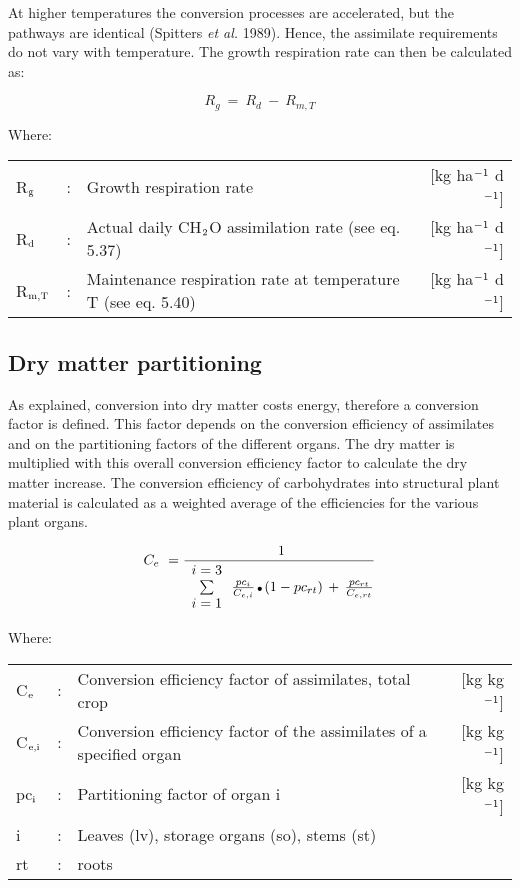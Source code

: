 At higher temperatures the conversion processes are accelerated, but the pathways are
identical (Spitters {\it et al.\/} 1989). Hence, the assimilate requirements do not vary with
temperature. The growth respiration rate can then be calculated as:

\begin{equation}
R _{g} ~=~ R _{d} ~-~ R _{m,T} 
\end{equation}

Where:\\
\begin{tabularx}{\textwidth}{llXr}
R$_{{\rm g}}$ &:& Growth respiration rate   &     [kg ha$^{{\rm -1}}$ d$^{{\rm -1}}$]\\
R$_{{\rm d}}$ &:& Actual daily CH$_{{\rm 2}}$O assimilation rate (see eq. 5.37)   &   
    [kg ha$^{{\rm -1}}$ d$^{{\rm -1}}$]\\
R$_{{\rm m,T}}$ &:& Maintenance respiration rate at 
    temperature T (see eq. 5.40)   &     [kg ha$^{{\rm -1}}$ d$^{{\rm -1}}$]\\
\end{tabularx}

\subsection{Dry matter partitioning  }

As explained, conver\-sion into dry matter costs energy, therefore a conversion factor is
defined. This factor depends on the conversion efficiency of assimi\-lates and on the
partition\-ing factors of the different organs. The dry matter is multiplied with this overall
conver\-sion efficiency factor to calculate the dry matter increase. The conver\-sion 
efficiency of carbohydrates into structural plant material is calculated as a weighted average
of the efficiencies for the various plant organs.

\begin{equation}
C _{e} ~={\frac{~1}{\begin{array}{c}{i=3}  \\
\sum  \\
{i=1}\end{array} \,{\frac{pc _{i} }{C _{e,i} }} \, {\rm \Bullet{0.75ex}}\, (1-pc _{rt} )\, +\,{\frac{ pc _{rt} }{C _{e,rt} }} }}
\end{equation}

Where:\\
\begin{tabularx}{\textwidth}{llXr}
C$_{{\rm e}}$ &:& Conversion efficiency factor of assimilates, total crop  &   
    [kg kg$^{{\rm -1}}$]\\
C$_{{\rm e,i}}$ &:& Conversion efficiency factor of the assimilates 
    of a specified organ  &      [kg kg$^{{\rm -1}}$]\\
pc$_{{\rm i}}$ &:& Partitioning factor of organ i   &
     [kg kg$^{{\rm -1}}$]\\
i &:& Leaves (lv), storage organs (so), stems (st)\\
rt &:& roots\\
\end{tabularx}

